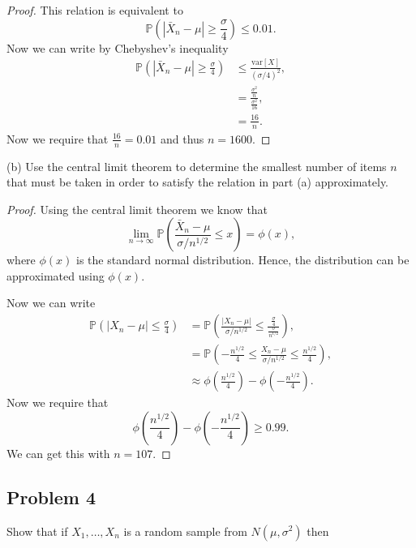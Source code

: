 \documentclass{article}
\renewcommand{\P}[1]{\mathbb{P}\left(#1\right)}
\newcommand{\var}[1]{\text{var}\left[#1\right]}
\newcommand{\randsamp}{X_1,\dots,X_n}
\begin{document}
\begin{proof}
    This relation is equivalent to
    \begin{equation*}
        \P{|\bar{X}_n - \mu| \geq \frac{\sigma}{4}} \leq 0.01.
    \end{equation*}
    Now we can write by Chebyshev's inequality
    \begin{align*}
        \P{|\bar{X}_n - \mu| \geq \frac{\sigma}{4}} & \leq \frac{\var{X}}{(\sigma/4)^2},                \\
                                                    & = \frac{\frac{\sigma^2}{n}}{\frac{\sigma^2}{16}}, \\
                                                    & = \frac{16}{n}.
    \end{align*}
    Now we require that $\frac{16}{n} = 0.01$ and thus $n = 1600$.
\end{proof}

(b) Use the central limit theorem to determine the smallest number of items $n$ that
must be taken in order to satisfy the relation in part (a) approximately.

\begin{proof}
    Using the central limit theorem we know that
    \begin{equation*}
        \lim_{n\to \infty} \P{\frac{\bar{X}_n - \mu}{\sigma/n^{1/2}} \leq x} = \phi(x),
    \end{equation*}
    where $\phi(x)$ is the standard normal distribution. Hence, the distribution can
    be approximated using $\phi(x)$.

    Now we can write
    \begin{align*}
        \P{|X_n - \mu| \leq \frac{\sigma}{4}}
         & = \P{\frac{|X_n - \mu|}{\sigma/n^{1/2}} \leq \frac{\frac{\sigma}{4}}{\frac{\sigma}{n^{1/2}}}}, \\
         & = \P{-\frac{n^{1/2}}{4} \leq \frac{X_n - \mu}{\sigma/n^{1/2}} \leq \frac{n^{1/2}}{4}},         \\
         & \approx \phi\left(\frac{n^{1/2}}{4}\right) - \phi\left(-\frac{n^{1/2}}{4}\right).
    \end{align*}
    Now we require that
    \begin{equation*}
        \phi\left(\frac{n^{1/2}}{4}\right) - \phi\left(-\frac{n^{1/2}}{4}\right) \geq 0.99.
    \end{equation*}
    We can get this with $n = 107$.
\end{proof}

\subsection*{Problem 4}
Show that if $\randsamp$ is a random sample from $N(\mu, \sigma^2)$ then
\end{document}
